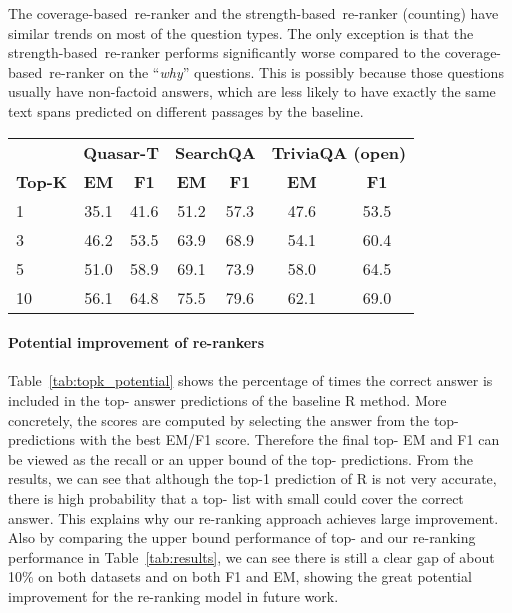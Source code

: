 \documentclass{article} \usepackage{iclr2018_conference,times}
\def \coherence {strength-based}
\def \union {coverage-based}
\begin{document}
The \union\ re-ranker and the \coherence\ re-ranker (counting) have similar trends on most of the question types. The only exception is that the \coherence\ re-ranker performs significantly worse compared to the \union\ re-ranker on the ``\emph{why}'' questions. This is possibly because those questions usually have non-factoid answers, which are less likely to have exactly the same text spans predicted on different passages by the baseline.

\begin{table*}[t]
\centering
\begin{tabular}{lcccccc}
\toprule
                  & \multicolumn{2}{c}{\bf Quasar-T} & \multicolumn{2}{c}{\bf SearchQA} & \multicolumn{2}{c}{\bf TriviaQA (open)}\\
    \bf Top-K             & \bf EM            & \bf F1            & \bf EM            & \bf F1 & \bf EM            & \bf F1 \\
\midrule
1  &  35.1 & 41.6 & 51.2 & 57.3 & 47.6 & 53.5 \\
3 & 46.2 & 53.5 & 63.9 & 68.9 & 54.1 & 60.4\\
5      & 51.0 & 58.9 & 69.1 & 73.9 & 58.0 & 64.5\\
10  & 56.1 & 64.8 & 75.5 & 79.6 & 62.1 & 69.0 \\
\bottomrule
\end{tabular}
\normalsize
\caption{The upper bound (recall) of the Top-K answer candidates generated by the baseline R system (on dev set), which indicates the potential of the \union\ re-ranker.}
\label{tab:topk_potential}
\end{table*}

\paragraph{Potential improvement of re-rankers}
Table~\ref{tab:topk_potential} shows the percentage of times the correct answer is included in the top- answer predictions of the baseline R method. 
More concretely, the scores are computed by selecting the answer from the top- predictions with the best EM/F1 score. Therefore the final top- EM and F1 can be viewed as the recall or an upper bound of the top- predictions. From the results, we can see that although the top-1 prediction of R is not very accurate, there is high probability that a top- list with small  could cover the correct answer. This explains why our re-ranking approach achieves large improvement. Also by comparing the upper bound performance of top- and our re-ranking performance in Table~\ref{tab:results}, we can see there is still a clear gap of about 10\% on both datasets and on both F1 and EM, showing the great potential improvement for the re-ranking model in future work.
\end{document}
